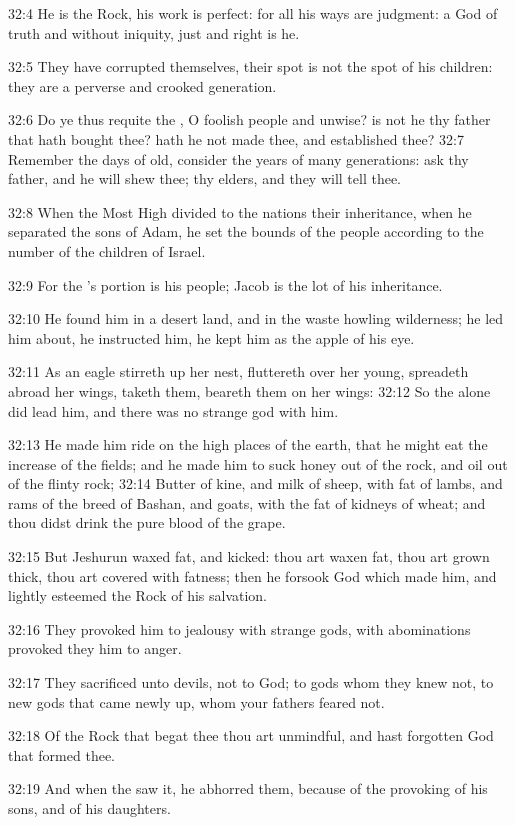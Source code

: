 32:4 He is the Rock, his work is perfect: for all his ways are
judgment: a God of truth and without iniquity, just and right is he.

32:5 They have corrupted themselves, their spot is not the spot of his
children: they are a perverse and crooked generation.

32:6 Do ye thus requite the \LORD, O foolish people and unwise? is not
he thy father that hath bought thee? hath he not made thee, and
established thee?  32:7 Remember the days of old, consider the years
of many generations: ask thy father, and he will shew thee; thy
elders, and they will tell thee.

32:8 When the Most High divided to the nations their inheritance, when
he separated the sons of Adam, he set the bounds of the people
according to the number of the children of Israel.

32:9 For the \LORD's portion is his people; Jacob is the lot of his
inheritance.

32:10 He found him in a desert land, and in the waste howling
wilderness; he led him about, he instructed him, he kept him as the
apple of his eye.

32:11 As an eagle stirreth up her nest, fluttereth over her young,
spreadeth abroad her wings, taketh them, beareth them on her wings:
32:12 So the \LORD alone did lead him, and there was no strange god
with him.

32:13 He made him ride on the high places of the earth, that he might
eat the increase of the fields; and he made him to suck honey out of
the rock, and oil out of the flinty rock; 32:14 Butter of kine, and
milk of sheep, with fat of lambs, and rams of the breed of Bashan, and
goats, with the fat of kidneys of wheat; and thou didst drink the pure
blood of the grape.

32:15 But Jeshurun waxed fat, and kicked: thou art waxen fat, thou art
grown thick, thou art covered with fatness; then he forsook God which
made him, and lightly esteemed the Rock of his salvation.

32:16 They provoked him to jealousy with strange gods, with
abominations provoked they him to anger.

32:17 They sacrificed unto devils, not to God; to gods whom they knew
not, to new gods that came newly up, whom your fathers feared not.

32:18 Of the Rock that begat thee thou art unmindful, and hast
forgotten God that formed thee.

32:19 And when the \LORD saw it, he abhorred them, because of the
provoking of his sons, and of his daughters.

